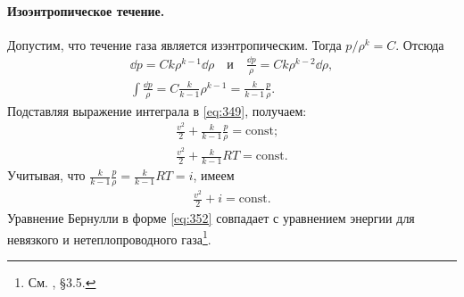 	\paragraph{Изоэнтропическое течение.} Допустим, что течение газа является изэнтропическим. Тогда $p/\rho^k = C$. Отсюда
	\begin{gather*}
		\dd p = C k\rho^{k-1}\dd\rho \quad \mathrm{и} \quad \frac{\dd p}{\rho} = C k\rho^{k-2}\dd\rho,\\
		\int\frac{\dd p}{\rho} = C\frac{k}{k-1}\rho^{k-1} = \frac{k}{k-1}\frac{p}{\rho}.
	\end{gather*}\n
	Подставляя выражение интеграла в \eqref{eq:349}, получаем:
	\begin{gather}
		\frac{v^2}{2} + \frac{k}{k-1}\frac{p}{\rho} = \mathrm{const};\label{eq:350}\\
		\frac{v^2}{2} + \frac{k}{k-1}RT = \mathrm{const}.\label{eq:351}
	\end{gather}\n
	Учитывая, что $\frac{k}{k-1}\frac{p}{\rho} = \frac{k}{k-1}RT = i$, имеем
	\begin{gather}\label{eq:352}
		\frac{v^2}{2} + i = \mathrm{const}.
	\end{gather}\n
	Уравнение Бернулли в форме \eqref{eq:352} совпадает с уравнением энергии для невязкого и нетеплопроводного газа\footnote{См. \cite{2}, \S3.5.}.
